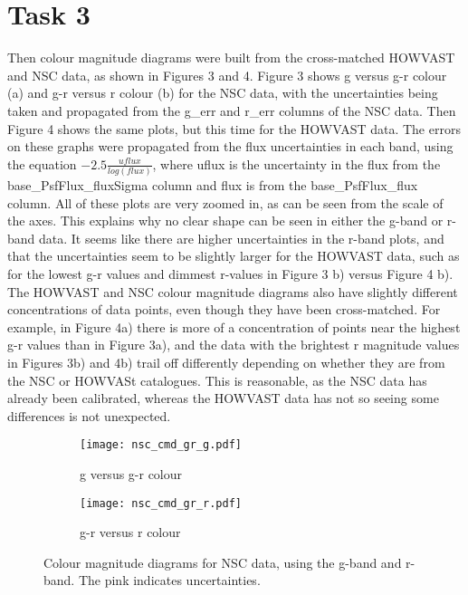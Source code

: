 \documentclass{article}
\begin{document}
\section*{Task 3}

Then colour magnitude diagrams were built from the cross-matched HOWVAST and NSC data, as shown in Figures 3 and 4. Figure 3 shows g versus g-r colour (a) and g-r versus r colour (b) for the NSC data, with the uncertainties being taken and propagated from the g\_err and r\_err columns of the NSC data. Then Figure 4 shows the same plots, but this time for the HOWVAST data. The errors on these graphs were propagated from the flux uncertainties in each band, using the equation $-2.5 \frac{uflux}{log (flux)}$, where uflux is the uncertainty in the flux from the base\_PsfFlux\_fluxSigma column and flux is from the base\_PsfFlux\_flux column. All of these plots are very zoomed in, as can be seen from the scale of the axes. This explains why no clear shape can be seen in either the g-band or r-band data. It seems like there are higher uncertainties in the r-band plots, and that the uncertainties seem to be slightly larger for the HOWVAST data, such as for the lowest g-r values and dimmest r-values in Figure 3 b) versus Figure 4 b). The HOWVAST and NSC colour magnitude diagrams also have slightly different concentrations of data points, even though they have been cross-matched. For example, in Figure 4a) there is more of a concentration of points near the highest g-r values than in Figure 3a), and the data with the brightest r magnitude values in Figures 3b) and 4b) trail off differently depending on whether they are from the NSC or HOWVASt catalogues. This is reasonable, as the NSC data has already been calibrated, whereas the HOWVAST data has not so seeing some differences is not unexpected. 

\clearpage
\begin{figure}[ht!]
\begin{subfigure}{.5\textwidth}
  \centering
  \texttt{[image: nsc\_cmd\_gr\_g.pdf]}
  \caption{g versus g-r colour}
  \label{fig:nsc1}
\end{subfigure}%
\begin{subfigure}{.5\textwidth}
  \centering
  \texttt{[image: nsc\_cmd\_gr\_r.pdf]}
  \caption{g-r versus r colour}
  \label{fig:nsc2}
\end{subfigure}
\caption{Colour magnitude diagrams for NSC data, using the g-band and r-band. The pink indicates uncertainties.}
\label{fig:nsc}
\end{figure}
\end{document}
